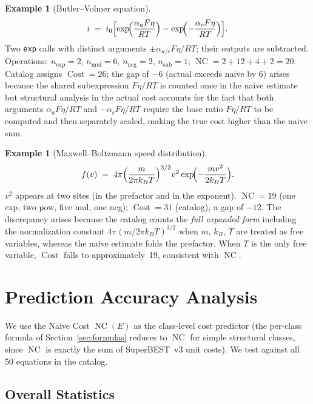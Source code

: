 \documentclass[12pt,a4paper]{article}
\theoremstyle{definition}
\newtheorem{example}[theorem]{Example}
\newcommand{\NC}{\operatorname{NC}}
\newcommand{\Cost}{\operatorname{Cost}}
\begin{document}
\begin{example}[Butler--Volmer equation]
\[
  i \;=\; i_0 \Bigl[
    \exp\!\Bigl(\frac{\alpha_a F \eta}{RT}\Bigr)
    - \exp\!\Bigl(-\frac{\alpha_c F \eta}{RT}\Bigr)
  \Bigr].
\]
Two \texttt{exp} calls with distinct arguments $\pm\alpha_{a/c} F\eta/RT$;
their outputs are subtracted.
Operations: $n_{\exp}=2$, $n_{\mathrm{mul}}=6$, $n_{\mathrm{neg}}=2$,
$n_{\mathrm{sub}}=1$; $\NC = 2+12+4+2 = 20$.
Catalog assigns $\Cost = 26$; the gap of $-6$ (actual exceeds naive by 6)
arises because the shared subexpression $F\eta/RT$ is counted once in the
naive estimate but structural analysis in the actual cost accounts for the
fact that both arguments $\alpha_a F\eta/RT$ and $-\alpha_c F\eta/RT$
require the base ratio $F\eta/RT$ to be computed and then separately scaled,
making the true cost higher than the naive sum.
\end{example}

\begin{example}[Maxwell--Boltzmann speed distribution]
\[
  f(v) \;=\; 4\pi
  \Bigl(\frac{m}{2\pi k_B T}\Bigr)^{3/2}
  v^2 \exp\!\Bigl(-\frac{mv^2}{2k_B T}\Bigr).
\]
$v^2$ appears at two sites (in the prefactor and in the exponent).
$\NC = 19$ (one exp, two pow, five mul, one neg);
$\Cost = 31$ (catalog), a gap of $-12$.
The discrepancy arises because the catalog counts the \emph{full expanded
form} including the normalization constant $4\pi(m/2\pi k_BT)^{3/2}$ when
$m$, $k_B$, $T$ are treated as free variables, whereas the naive estimate
folds the prefactor.
When $T$ is the only free variable, $\Cost$ falls to approximately~19,
consistent with $\NC$.
\end{example}

\section{Prediction Accuracy Analysis}
\label{sec:accuracy}

We use the Naive Cost $\NC(E)$ as the class-level cost predictor
(the per-class formula of Section~\ref{sec:formulas} reduces to $\NC$
for simple structural classes, since $\NC$ is exactly the sum of
SuperBEST~v3 unit costs).
We test against all 50 equations in the catalog.

\subsection{Overall Statistics}
\end{document}
